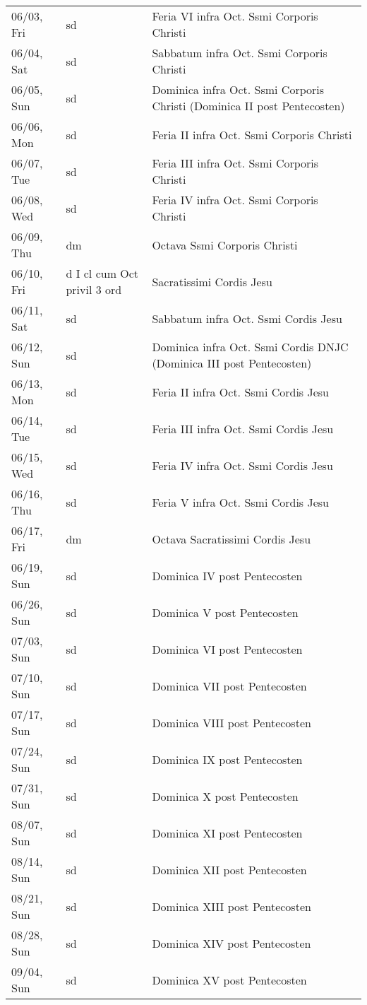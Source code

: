 \documentclass{article}
\begin{document}
\begin{longtable}{ l l l }
06/03, Fri & sd & Feria VI infra Oct. Ssmi Corporis Christi\\
06/04, Sat & sd & Sabbatum infra Oct. Ssmi Corporis Christi\\
06/05, Sun & sd & Dominica infra Oct. Ssmi Corporis Christi (Dominica II post Pentecosten)\\
06/06, Mon & sd & Feria II infra Oct. Ssmi Corporis Christi\\
06/07, Tue & sd & Feria III infra Oct. Ssmi Corporis Christi\\
06/08, Wed & sd & Feria IV infra Oct. Ssmi Corporis Christi\\
06/09, Thu & dm & Octava Ssmi Corporis Christi\\
06/10, Fri & d I cl cum Oct privil 3 ord & Sacratissimi Cordis Jesu\\
06/11, Sat & sd & Sabbatum infra Oct. Ssmi Cordis Jesu\\
06/12, Sun & sd & Dominica infra Oct. Ssmi Cordis DNJC (Dominica III post Pentecosten)\\
06/13, Mon & sd & Feria II infra Oct. Ssmi Cordis Jesu\\
06/14, Tue & sd & Feria III infra Oct. Ssmi Cordis Jesu\\
06/15, Wed & sd & Feria IV infra Oct. Ssmi Cordis Jesu\\
06/16, Thu & sd & Feria V infra Oct. Ssmi Cordis Jesu\\
06/17, Fri & dm & Octava Sacratissimi Cordis Jesu\\
06/19, Sun & sd & Dominica IV post Pentecosten\\
06/26, Sun & sd & Dominica V post Pentecosten\\
07/03, Sun & sd & Dominica VI post Pentecosten\\
07/10, Sun & sd & Dominica VII post Pentecosten\\
07/17, Sun & sd & Dominica VIII post Pentecosten\\
07/24, Sun & sd & Dominica IX post Pentecosten\\
07/31, Sun & sd & Dominica X post Pentecosten\\
08/07, Sun & sd & Dominica XI post Pentecosten\\
08/14, Sun & sd & Dominica XII post Pentecosten\\
08/21, Sun & sd & Dominica XIII post Pentecosten\\
08/28, Sun & sd & Dominica XIV post Pentecosten\\
09/04, Sun & sd & Dominica XV post Pentecosten\\

\end{longtable}
\end{document}
